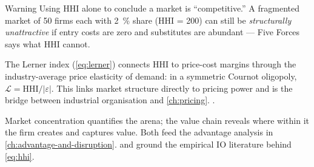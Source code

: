 \begin{admonition}{Warning}
Using HHI alone to conclude a market is ``competitive.'' A fragmented market of 50 firms
each with \qty{2}{\percent} share (HHI = \num{200}) can still be \emph{structurally
unattractive} if entry costs are zero and substitutes are abundant --- Five Forces says what
HHI cannot.
\end{admonition}

The Lerner index (\cref{eq:lerner}) connects HHI to price-cost margins through the
industry-average price elasticity of demand: in a symmetric Cournot oligopoly,
\(\mathcal{L} = \mathrm{HHI}/|\varepsilon|\). This links market structure directly to
pricing power and is the bridge between industrial organisation and \cref{ch:pricing}.
\parencite{mankiw2020,dranove7theconomics}.

Market concentration quantifies the arena; the value chain reveals where within it the firm
creates and captures value. Both feed the advantage analysis in
\cref{ch:advantage-and-disruption}. \textcite{mankiw2020} and \textcite{dranove7theconomics}
ground the empirical IO literature behind \cref{eq:hhi}.
